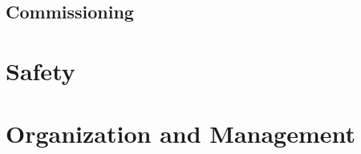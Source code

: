 \subsection{Commissioning}
\label{sec:fdsp-daq-commissioning}


%


%
%
%
%
%



\section{Safety}
\label{sec:fdsp-daq-safety}






\section{Organization and Management}
\label{sec:fdsp-daq-org}

